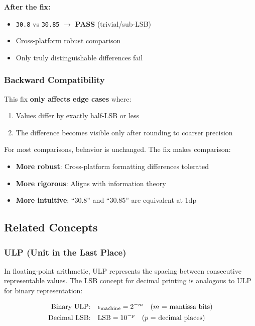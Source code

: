\textbf{After the fix:}
\begin{itemize}
    \item \texttt{30.8} vs \texttt{30.85} $\to$ \textbf{PASS} (trivial/sub-LSB)
    \item Cross-platform robust comparison
    \item Only truly distinguishable differences fail
\end{itemize}

\subsubsection{Backward Compatibility}

This fix \textbf{only affects edge cases} where:
\begin{enumerate}
    \item Values differ by exactly half-LSB or less
    \item The difference becomes visible only after rounding to coarser precision
\end{enumerate}

For most comparisons, behavior is unchanged. The fix makes comparison:
\begin{itemize}
    \item \textbf{More robust}: Cross-platform formatting differences tolerated
    \item \textbf{More rigorous}: Aligns with information theory
    \item \textbf{More intuitive}: ``30.8'' and ``30.85'' are equivalent at 1dp
\end{itemize}

\subsection{Related Concepts}

\subsubsection{ULP (Unit in the Last Place)}

In floating-point arithmetic, ULP represents the spacing between consecutive representable values. The LSB concept for decimal printing is analogous to ULP for binary representation:

\begin{align}
    \text{Binary ULP:} \quad & \epsilon_{\text{machine}} = 2^{-m} \quad \text{($m$ = mantissa bits)} \\
    \text{Decimal LSB:} \quad & \mathrm{LSB} = 10^{-p} \quad \text{($p$ = decimal places)}
\end{align}

